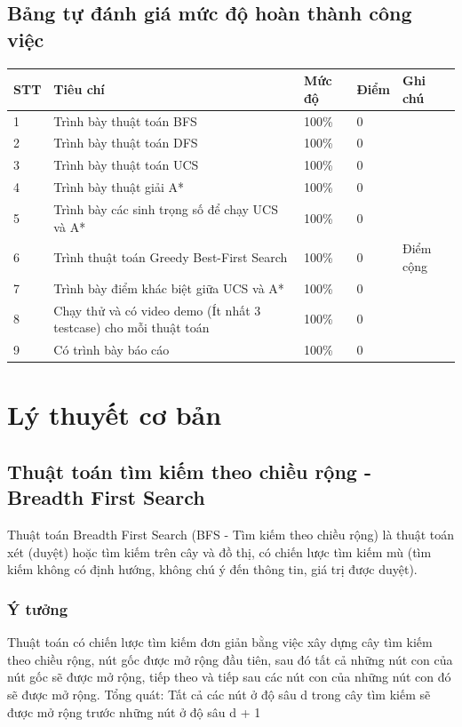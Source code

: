 \documentclass{article}
\newcommand{\ra}[1]{\renewcommand{\arraystretch}{#1}}
\begin{document}
\subsection{Bảng tự đánh giá mức độ hoàn thành công việc}

\begin{table}[h]\centering
\ra{1.3}
\begin{tabular}{lllll}\toprule
\textbf{STT} & \textbf{Tiêu chí} & \textbf{Mức độ} & \textbf{Điểm} & \textbf{Ghi chú} \\\midrule
1 & Trình bày thuật toán BFS & 100\% & 0 & \\
2 & Trình bày thuật toán DFS & 100\% & 0 & \\
3 & Trình bày thuật toán UCS & 100\% & 0 & \\
4 & Trình bày thuật giải A* & 100\% & 0 & \\
5 & Trình bày các sinh trọng số để chạy UCS và A* & 100\% & 0 & \\
6 & Trình thuật toán Greedy Best-First Search & 100\% & 0 & Điểm cộng\\
7 & Trình bày điểm khác biệt giữa UCS và A* & 100\% & 0 & \\
8 & Chạy thử và có video demo (Ít nhất 3 testcase) cho mỗi thuật toán & 100\% & 0 & \\
9 & Có trình bày báo cáo & 100\% & 0 & \\
\bottomrule
\end{tabular}
\end{table}

\newpage

\section{Lý thuyết cơ bản}

\subsection{Thuật toán tìm kiếm theo chiều rộng - Breadth First Search}

Thuật toán Breadth First Search (BFS - Tìm kiếm theo chiều rộng) là thuật toán xét (duyệt) hoặc tìm kiếm trên cây và đồ thị, có chiến lược tìm kiếm mù (tìm kiếm không có định hướng, không chú ý đến thông tin, giá trị được duyệt).\newline

\subsubsection{Ý tưởng}
Thuật toán có chiến lược tìm kiếm đơn giản bằng việc xây dựng cây tìm kiếm theo chiều rộng, nút gốc được mở rộng đầu tiên, sau đó tất cả những nút con của nút gốc sẽ được mở rộng, tiếp theo và tiếp sau các nút con của những nút con đó sẽ được mở rộng. \newline
Tổng quát: Tất cả các nút ở độ sâu d trong cây tìm kiếm sẽ được mở rộng trước những nút ở độ sâu d + 1
\end{document}
